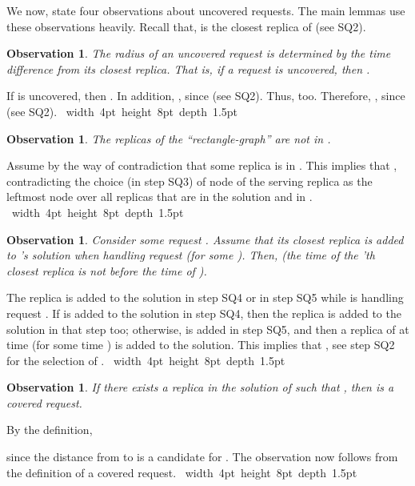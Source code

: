 \documentclass[11pt]{article}
\newtheorem{observation}[theorem]{Observation}
\def\proof{\par\noindent{\bf Proof:~}}
\def\blackslug{\hbox{\hskip 1pt \vrule width 4pt height 8pt
    depth 1.5pt \hskip 1pt}}
\def\QED{\quad\blackslug\lower 8.5pt\null\par}
\begin{document}
We now, state four observations about uncovered requests.
The main lemmas use these observations heavily.
Recall that,  is the closest replica of  (see SQ2).

\begin{observation}
The radius of an uncovered request is determined by the {\em time difference} from its closest replica.
That is, if a request  is uncovered, then . \label{obser:sqr: if ri is uncovered then rad(i)= ti-s'i}
\end{observation}
\proof
If  is uncovered, then .
In addition, , since  (see SQ2).
Thus,  too.
Therefore, , since  (see SQ2).
\QED


\begin{observation}
The replicas of the ``rectangle-graph'' 
are not in .
\label{obser:sqr: no replicas is in left rectangle}
\end{observation}
\proof
Assume by the way of contradiction that some replica  is in .
This implies that ,
contradicting the choice (in step SQ3) of node  of the serving replica  as the leftmost node over all replicas that are in the solution and in .
\QED





\begin{observation}
Consider some request .
Assume that its closest replica  is added to 's solution when handling request  (for some ).
Then,  (the time of the 'th closest replica is not before the time  of ).
\label{obser:sqr: closest replica is of time later than}
\end{observation}
\proof
The replica  is added to the solution in step SQ4 or in step SQ5 while  is handling request .
If  is added to the solution in step SQ4, then the replica  is added to the solution in that step too;
otherwise,  is added in step SQ5, and then a replica of  at time  (for some time ) is added to the solution.
This implies that , see step SQ2 for the selection of .
\QED



\begin{observation}
If there exists a replica  in the solution of  such that ,
then  is a covered request.
\label{obser:sqr: if soff=ti then ri is covered}
\end{observation}
\proof
By the definition,

since the distance from  to  is a candidate for .
The observation now follows from the definition of a covered request.
\QED
\end{document}
